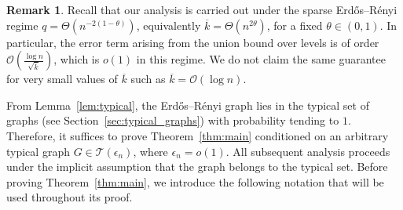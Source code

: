 \documentclass[journal]{IEEEtran}
\theoremstyle{definition}
\newtheorem{remark}{Remark}
\theoremstyle{definition}
\newcommand{\Ec}{\mathcal{E}}
\newcommand{\Gc}{\mathcal{G}}
\newcommand{\Tc}{\mathcal{T}}
\newcommand{\EE}{\mathbb{E}}
\newcommand{\rE}{\mathrm{E}}
\newcommand{\kb}{\overline{k}}
\newcommand{\bigO}{\mathcal{O}}
\begin{document}
\begin{remark}
Recall that our analysis is carried out under the sparse Erd\H{o}s--R\'enyi regime $q=\Theta(n^{-2(1-\theta)})$, equivalently $\kb=\Theta(n^{2\theta})$, for a fixed \(\theta\in(0,1)\). In particular, the error term arising from the union bound over levels is of order \(\bigO(\frac{\log n}{\sqrt{\kb}})\), which is \(o(1)\) in this regime. We do not claim the same guarantee for very small values of \(\kb\) such as \( \kb = \bigO(\log n) \).
\end{remark}
From Lemma~\ref{lem:typical}, the Erdős–Rényi graph lies in the typical set of graphs (see Section~\ref{sec:typical_graphs}) with probability tending to $1$. 
Therefore, it suffices to prove Theorem~\ref{thm:main} conditioned on an arbitrary typical graph \( G \in \Tc(\epsilon_n) \), where \( \epsilon_n = o(1) \). 
All subsequent analysis proceeds under the implicit assumption that the graph belongs to the typical set.  Before proving Theorem~\ref{thm:main}, we introduce the following notation that will be used throughout its proof.





\end{document}
